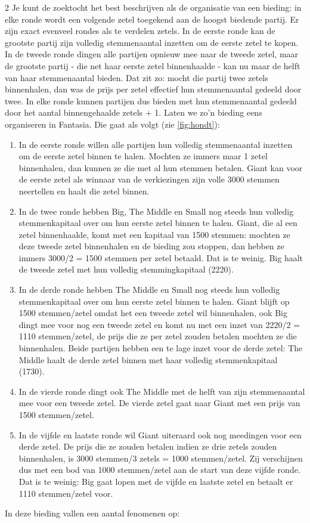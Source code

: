 \begin{multicols}{2}
Je kunt de zoektocht het best beschrijven als de organisatie van een bieding: in elke ronde wordt een volgende zetel toegekend aan de hoogst biedende partij. Er zijn exact evenveel rondes als te verdelen zetels. In de eerste ronde kan de grootste partij zijn volledig stemmenaantal inzetten om de eerste zetel te kopen. In de tweede ronde  dingen alle partijen opnieuw mee naar de tweede zetel, maar de grootste partij - die net haar eerste zetel binnenhaalde - kan nu maar de helft van haar stemmenaantal bieden. Dat zit zo: mocht die partij twee zetels binnenhalen, dan was de prijs per zetel effectief hun stemmenaantal gedeeld door twee. In elke ronde kunnen partijen dus bieden met hun stemmenaantal gedeeld door het aantal binnengehaalde zetels + 1.
Laten we zo'n bieding eens organiseren in Fantasia. Die gaat als volgt (zie \autoref{fig:hondt}): 
\begin{enumerate}
    \item In de eerste ronde willen alle partijen hun volledig stemmenaantal inzetten om de eerste zetel binnen te halen. Mochten ze immers maar 1 zetel binnenhalen, dan kunnen ze die met al hun stemmen betalen. Giant kan voor de eerste zetel als winnaar van de verkiezingen zijn volle 3000 stemmen neertellen en haalt die zetel binnen.
    \item In de twee ronde hebben Big, The Middle en Small nog steeds hun volledig stemmenkapitaal over om hun eerste zetel binnen te halen. Giant, die al een zetel binnenhaalde, komt met een kapitaal van 1500 stemmen: mochten ze deze tweede zetel binnenhalen en de bieding zou stoppen, dan hebben ze immers 3000/2 = 1500 stemmen per zetel betaald. Dat is te weinig. Big haalt de tweede zetel met hun volledig stemmingkapitaal (2220).
    \item In de derde ronde hebben The Middle en Small nog steeds hun volledig stemmenkapitaal over om hun eerste zetel binnen te halen. Giant blijft op 1500 stemmen/zetel omdat het een tweede zetel wil binnenhalen, ook Big dingt mee voor nog een tweede zetel en komt nu met een inzet van 2220/2 = 1110 stemmen/zetel, de prijs die ze per zetel zouden betalen mochten ze die binnenhalen. Beide partijen hebben een te lage inzet voor de derde zetel: The Middle haalt de derde zetel binnen met haar volledig stemmenkapitaal (1730).
    \item In de vierde ronde dingt ook The Middle met de helft van zijn stemmenaantal mee voor een tweede zetel. De vierde zetel gaat naar Giant met een prijs van 1500 stemmen/zetel.
    \item In de vijfde en laatste ronde wil Giant uiteraard ook nog meedingen voor een derde zetel. De prijs die ze zouden betalen indien ze drie zetels zouden binnenhalen, is 3000 stemmen/3 zetels = 1000 stemmen/zetel. Zij verschijnen dus met een bod van 1000 stemmen/zetel aan de start van deze vijfde ronde. Dat is te weinig: Big gaat lopen met de vijfde en laatste zetel en betaalt er {\color{cyan}1110} stemmen/zetel voor.    
\end{enumerate}
In deze bieding vallen een aantal fenomenen op:


\end{multicols}
